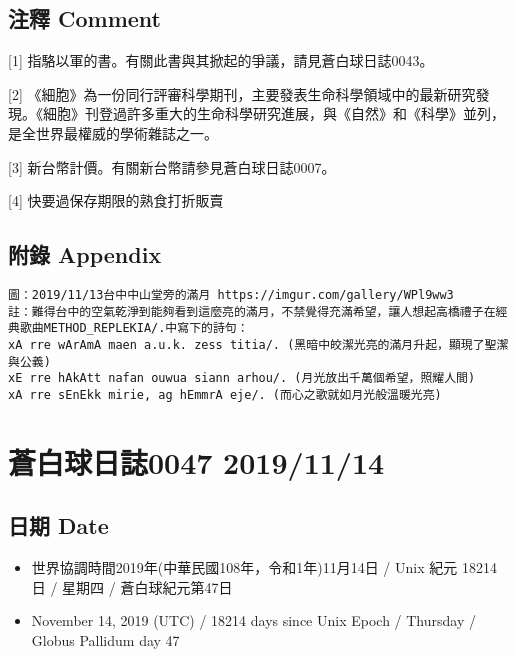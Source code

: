 \documentclass[
]{article}
\providecommand{\tightlist}{%
  \setlength{\itemsep}{0pt}\setlength{\parskip}{0pt}}
\begin{document}
\hypertarget{ux6ce8ux91cb-comment-39}{%
\subsection{注釋 Comment}\label{ux6ce8ux91cb-comment-39}}

{[}1{]} 指駱以軍的書。有關此書與其掀起的爭議，請見蒼白球日誌0043。

{[}2{]}
《細胞》為一份同行評審科學期刊，主要發表生命科學領域中的最新研究發現。《細胞》刊登過許多重大的生命科學研究進展，與《自然》和《科學》並列，是全世界最權威的學術雜誌之一。

{[}3{]} 新台幣計價。有關新台幣請參見蒼白球日誌0007。

{[}4{]} 快要過保存期限的熟食打折販賣

\hypertarget{ux9644ux9304-appendix-38}{%
\subsection{附錄 Appendix}\label{ux9644ux9304-appendix-38}}

\begin{verbatim}
圖：2019/11/13台中中山堂旁的滿月 https://imgur.com/gallery/WPl9ww3
註：難得台中的空氣乾淨到能夠看到這麼亮的滿月，不禁覺得充滿希望，讓人想起高橋禮子在經典歌曲METHOD_REPLEKIA/.中寫下的詩句：
xA rre wArAmA maen a.u.k. zess titia/. (黑暗中皎潔光亮的滿月升起，顯現了聖潔與公義)
xE rre hAkAtt nafan ouwua siann arhou/. (月光放出千萬個希望，照耀人間)
xA rre sEnEkk mirie, ag hEmmrA eje/. (而心之歌就如月光般溫暖光亮)
\end{verbatim}

\hypertarget{ux84bcux767dux7403ux65e5ux8a8c0047-20191114}{%
\section{蒼白球日誌0047
2019/11/14}\label{ux84bcux767dux7403ux65e5ux8a8c0047-20191114}}

\hypertarget{ux65e5ux671f-date-46}{%
\subsection{日期 Date}\label{ux65e5ux671f-date-46}}

\begin{itemize}
\tightlist
\item
  世界協調時間2019年(中華民國108年，令和1年)11月14日 / Unix 紀元 18214
  日 / 星期四 / 蒼白球紀元第47日
\item
  November 14, 2019 (UTC) / 18214 days since Unix Epoch / Thursday /
  Globus Pallidum day 47
\end{itemize}
\end{document}
